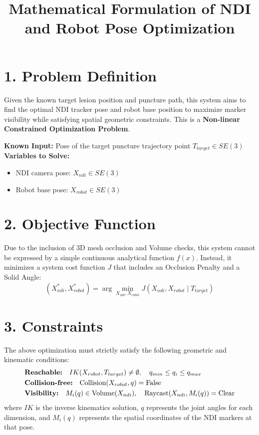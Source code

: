 \documentclass[12pt, a4paper]{article}
\title{\textbf{Mathematical Formulation of NDI and Robot Pose Optimization}}
\author{}
\date{}
\begin{document}
\maketitle
\thispagestyle{empty} %

\section*{1. Problem Definition}
Given the known target lesion position and puncture path, this system aims to find the optimal NDI tracker pose and robot base position to maximize marker visibility while satisfying spatial geometric constraints. This is a \textbf{Non-linear Constrained Optimization Problem}.

\textbf{Known Input:} Pose of the target puncture trajectory point $T_{target} \in SE(3)$ \\
\textbf{Variables to Solve:} 
\begin{itemize}
    \item NDI camera pose: $X_{ndi} \in SE(3)$
    \item Robot base pose: $X_{robot} \in SE(3)$
\end{itemize}

\section*{2. Objective Function}
Due to the inclusion of 3D mesh occlusion and Volume checks, this system cannot be expressed by a simple continuous analytical function $f(x)$. Instead, it minimizes a system cost function $J$ that includes an Occlusion Penalty and a Solid Angle:
\begin{equation}
    (X_{ndi}^*, X_{robot}^*) = \arg\min_{X_{ndi}, X_{robot}} J(X_{ndi}, X_{robot} \mid T_{target})
\end{equation}

\section*{3. Constraints}
The above optimization must strictly satisfy the following geometric and kinematic conditions:
\begin{align}
    &\text{\textbf{Reachable:}} \quad IK(X_{robot}, T_{target}) \neq \emptyset, \quad q_{min} \le q_i \le q_{max} \\
    &\text{\textbf{Collision-free:}} \quad \text{Collision}(X_{robot}, q) = \text{False} \\
    &\text{\textbf{Visibility:}} \quad M_i(q) \in \text{Volume}(X_{ndi}), \quad \text{Raycast}(X_{ndi}, M_i(q)) = \text{Clear}
\end{align}
where $IK$ is the inverse kinematics solution, $q$ represents the joint angles for each dimension, and $M_i(q)$ represents the spatial coordinates of the NDI markers at that pose.
\end{document}
